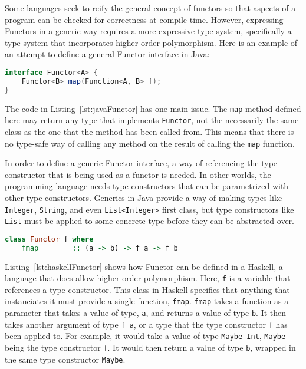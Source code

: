 Some languages seek to reify the general concept of functors so that aspects of
a program can be checked for correctness at compile time. However, expressing
Functors in a generic way requires a more expressive type system, specifically
a type system that incorporates higher order polymorphism. Here is an example
of an attempt to define a general Functor interface in Java:

\begin{lstlisting}[caption=An attempt to define Functor in Java, language=Java, label={lst:javaFunctor}]
interface Functor<A> {
    Functor<B> map(Function<A, B> f);
}
\end{lstlisting}

The code in Listing~\ref{lst:javaFunctor} has one main issue. The
\lstinline{map} method defined here may return any type that implements
\lstinline{Functor}, not the necessarily the same class as the one that the
method has been called from. This means that there is no type-safe way of
calling any method on the result of calling the \lstinline{map} function.

In order to define a generic Functor interface, a way of referencing the type
constructor that is being used as a functor is needed. In other worlds, the
programming language needs type constructors that can be parametrized with
other type constructors. Generics in Java provide a way of making types like
\lstinline{Integer}, \lstinline{String}, and even \lstinline{List<Integer>}
first class, but type constructors like \lstinline{List} must be applied to
some concrete type before they can be abstracted over.

\begin{lstlisting}[caption=Functor as defined in Haskell., language=Haskell, label={lst:haskellFunctor}]
class Functor f where
    fmap        :: (a -> b) -> f a -> f b
\end{lstlisting}

Listing~\ref{lst:haskellFunctor} shows how Functor can be defined in a Haskell,
a language that does allow higher order polymorphism. Here, \lstinline{f} is a
variable that references a type constructor. This class in Haskell specifies
that anything that instanciates it must provide a single function,
\lstinline{fmap}.  \lstinline{fmap} takes a function as a parameter that takes
a value of type, \lstinline{a}, and returns a value of type \lstinline{b}. It
then takes another argument of type \lstinline{f a}, or a type that the type
constructor \lstinline{f} has been applied to. For example, it would take a
value of type \lstinline{Maybe Int}, \lstinline{Maybe} being the type
constructor \lstinline{f}. It would then return a value of type \lstinline{b},
wrapped in the same type constructor \lstinline{Maybe}.

